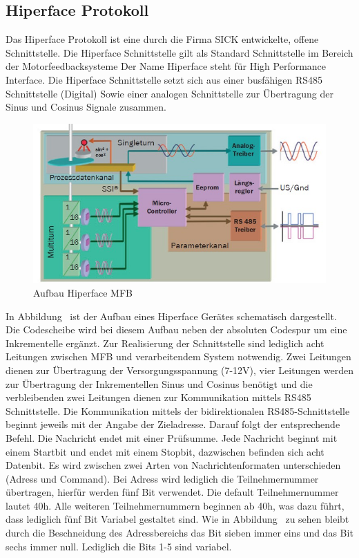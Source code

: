 \subsection{Hiperface Protokoll}
Das Hiperface Protokoll ist eine durch die Firma SICK entwickelte, offene Schnittstelle. Die Hiperface  Schnittstelle gilt als Standard Schnittstelle im Bereich der Motorfeedbacksysteme
Der Name Hiperface steht für High Performance Interface. Die Hiperface Schnittstelle setzt sich  aus einer busfähigen RS485 Schnittstelle (Digital) Sowie einer analogen Schnittstelle zur Übertragung der Sinus und Cosinus Signale zusammen. 
\begin{figure}[h]
  \centering
   \includegraphics[width=1\textwidth]{img/Aufbau_Hiperface_MFB.jpg} 
   \caption[Aufbau Hiperface MFB]{ Aufbau Hiperface \ac{MFB} \cite{SICKAG.2021}}
   \label{fig:AufbauHiperfaceMFB.jpg}
\end{figure}
In Abbildung \dq {}\dq~ist der Aufbau eines Hiperface Gerätes schematisch dargestellt. Die Codescheibe wird bei diesem Aufbau neben der absoluten Codespur um eine Inkrementelle ergänzt.
 Zur Realisierung der Schnittstelle sind lediglich acht Leitungen zwischen \ac{MFB} und verarbeitendem System notwendig. Zwei Leitungen dienen zur Übertragung der Versorgungsspannung (7-12V), vier Leitungen werden zur Übertragung der Inkrementellen Sinus und Cosinus benötigt und die verbleibenden zwei Leitungen dienen zur Kommunikation mittels RS485 Schnittstelle. Die Kommunikation mittels der bidirektionalen RS485-Schnittstelle beginnt  jeweils mit der Angabe der Zieladresse. Darauf folgt der entsprechende Befehl. Die Nachricht endet mit einer Prüfsumme. Jede Nachricht beginnt mit einem Startbit und endet mit einem Stopbit, dazwischen befinden sich acht Datenbit. Es wird zwischen zwei Arten von Nachrichtenformaten unterschieden (Adress und Command). Bei Adress wird lediglich die Teilnehmernummer übertragen, hierfür werden fünf Bit verwendet. Die default Teilnehmernummer lautet 40h. Alle weiteren Teilnehmernummern beginnen ab 40h, was dazu führt, dass lediglich fünf Bit Variabel gestaltet sind. Wie in Abbildung \dq {}\dq~zu sehen bleibt durch die Beschneidung des Adressbereichs das Bit sieben immer  eins und das Bit sechs immer null. Lediglich die Bits 1-5 sind variabel.
